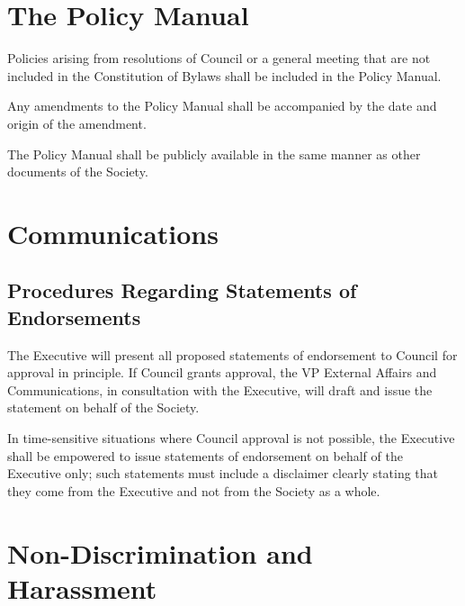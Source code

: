 \section{The Policy Manual}
\begin{longenum}[ label*=\thesection.\arabic*., align=left]
	\item Policies arising from resolutions of Council or a general meeting that are not included in the Constitution of Bylaws shall be included in the Policy Manual.
    \item Any amendments to the Policy Manual shall be accompanied by the date and origin of the amendment.
    \item The Policy Manual shall be publicly available in the same manner as other documents of the Society.
\end{longenum}
\newpage

\section{Communications}
\subsection{Procedures Regarding Statements of Endorsements}
\begin{longenum}[ label*=\thesection.\arabic*., align=left]
	\item The Executive will present all proposed statements of endorsement to Council for approval in principle. If Council grants approval, the VP External Affairs and Communications, in consultation with the Executive, will draft and issue the statement on behalf of the Society. 
    \item In time-sensitive situations where Council approval is not possible, the Executive shall be empowered to issue statements of endorsement on behalf of the Executive only; such statements must include a disclaimer clearly stating that they come from the Executive and not from the Society as a whole. 
\end{longenum}
\newpage

\section{Non-Discrimination and Harassment}

